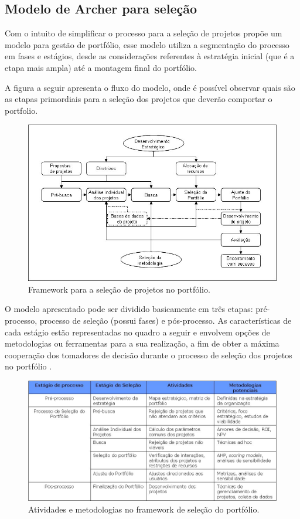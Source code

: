 \documentclass[12pt,a4paper,ruledheader,tocpage=prefix,floatnumber=continuous,pagestart=folhaderosto,font=times]{abnt}
\begin{document}
\subsection{Modelo de Archer para seleção}
Com o intuito de simplificar o processo para a seleção de projetos \cite{archer} propõe um modelo para gestão de portfólio, esse modelo utiliza a 
segmentação do processo em fases e estágios, desde as considerações referentes à estratégia inicial (que é a etapa mais ampla) até a montagem final do 
portfólio.

A figura a seguir apresenta o fluxo do modelo, onde é possível observar quais são as etapas primordiais para a seleção dos projetos que deverão comportar
o portfolio.

\begin{figure}[H]
\centering
\includegraphics[width=.9\textwidth]{archer.jpg}
\caption{Framework para a seleção de projetos no portfólio\cite{archer}.}
\end{figure}

O modelo apresentado pode ser dividido basicamente em três etapas: pré-processo, processo de seleção (possui fases) e pós-processo. As características 
de cada estágio estão representadas no quadro a seguir e envolvem opções de metodologias ou ferramentas para a sua realização, a fim de obter a máxima 
cooperação dos tomadores de decisão durante o processo de seleção dos projetos no portfólio \cite{archer}. 

\begin{figure}[H]
\centering
\includegraphics[width=.9\textwidth]{tabela_archer.jpg}
\caption{Atividades e metodologias no framework de seleção do portfólio\cite{archer}.}
\end{figure}
\end{document}
